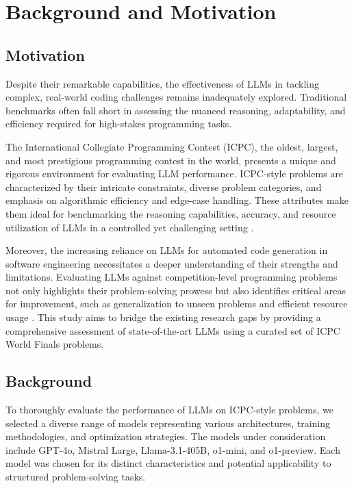 \section{Background and Motivation}

\subsection{Motivation}
Despite their remarkable capabilities, the effectiveness of LLMs in tackling complex, real-world coding challenges remains inadequately explored. Traditional benchmarks often fall short in assessing the nuanced reasoning, adaptability, and efficiency required for high-stakes programming tasks.

The International Collegiate Programming Contest (ICPC), the oldest, largest, and most prestigious programming contest in the world, presents a unique and rigorous environment for evaluating LLM performance\cite{Chen2021Evaluating}. ICPC-style problems are characterized by their intricate constraints, diverse problem categories, and emphasis on algorithmic efficiency and edge-case handling. These attributes make them ideal for benchmarking the reasoning capabilities, accuracy, and resource utilization of LLMs in a controlled yet challenging setting \cite{b1,b2}.

Moreover, the increasing reliance on LLMs for automated code generation in software engineering necessitates a deeper understanding of their strengths and limitations. Evaluating LLMs against competition-level programming problems not only highlights their problem-solving prowess but also identifies critical areas for improvement, such as generalization to unseen problems and efficient resource usage \cite{b3,b4}. This study aims to bridge the existing research gaps by providing a comprehensive assessment of state-of-the-art LLMs using a curated set of ICPC World Finals problems.

\subsection{Background}
To thoroughly evaluate the performance of LLMs on ICPC-style problems, we selected a diverse range of models representing various architectures, training methodologies, and optimization strategies. The models under consideration include GPT-4o, Mistral Large, Llama-3.1-405B, o1-mini, and o1-preview. Each model was chosen for its distinct characteristics and potential applicability to structured problem-solving tasks.

